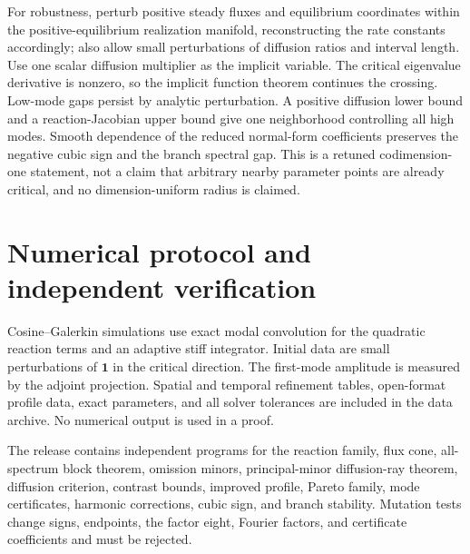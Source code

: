 \documentclass[10pt]{article}
\newcommand{\1}{\mathbf1}
\begin{document}
For robustness, perturb positive steady fluxes and equilibrium coordinates
within the positive-equilibrium realization manifold, reconstructing the
rate constants accordingly; also allow small perturbations of diffusion
ratios and interval length.  Use one scalar diffusion multiplier as the
implicit variable.  The critical eigenvalue derivative is nonzero, so the
implicit function theorem continues the crossing.  Low-mode gaps persist by
analytic perturbation.  A positive diffusion lower bound and a
reaction-Jacobian upper bound give one neighborhood controlling all high
modes.  Smooth dependence of the reduced normal-form coefficients preserves the
negative cubic sign and the branch spectral gap.  This is a retuned
codimension-one statement, not a claim that arbitrary nearby parameter points
are already critical, and no dimension-uniform radius is claimed.

\section{Numerical protocol and independent verification}

Cosine--Galerkin simulations use exact modal convolution for the quadratic
reaction terms and an adaptive stiff integrator.  Initial data are small
perturbations of $\1$ in the critical direction.  The first-mode amplitude is
measured by the adjoint projection.  Spatial and temporal refinement tables,
open-format profile data, exact parameters, and all solver tolerances are
included in the data archive.  No numerical output is used in a proof.

The release contains independent programs for the reaction family, flux cone,
all-spectrum block theorem, omission minors, principal-minor diffusion-ray theorem, diffusion
criterion, contrast bounds, improved profile, Pareto family, mode
certificates, harmonic corrections, cubic sign, and branch stability.
Mutation tests change signs, endpoints, the factor eight, Fourier factors,
and certificate coefficients and must be rejected.
\end{document}
